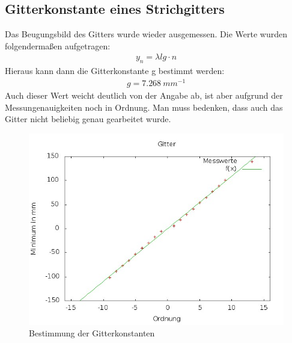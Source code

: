 \documentclass[ngerman, parskip*]{scrartcl}
\begin{document}
\subsection{Gitterkonstante eines Strichgitters}
Das Beugungsbild des Gitters wurde wieder ausgemessen. Die Werte wurden folgendermaßen aufgetragen:
\begin{align*}
y_n=\lambda l g \cdot n
\end{align*}
Hieraus kann dann die Gitterkonstante g bestimmt werden:
\begin{align*}
g=\SI{7,268}{mm^{-1}}
\end{align*}
Auch dieser Wert weicht deutlich von der Angabe ab, ist aber aufgrund der Messungenauigkeiten noch in Ordnung. Man muss bedenken, dass auch das Gitter nicht beliebig genau gearbeitet wurde.
\begin{figure}
          \centering
          \includegraphics[width=\textwidth,natwidth=2560,natheight=1920]{Diagramme/gitter.jpg}
          \caption{Bestimmung der Gitterkonstanten}
          \end{figure}
\end{document}

